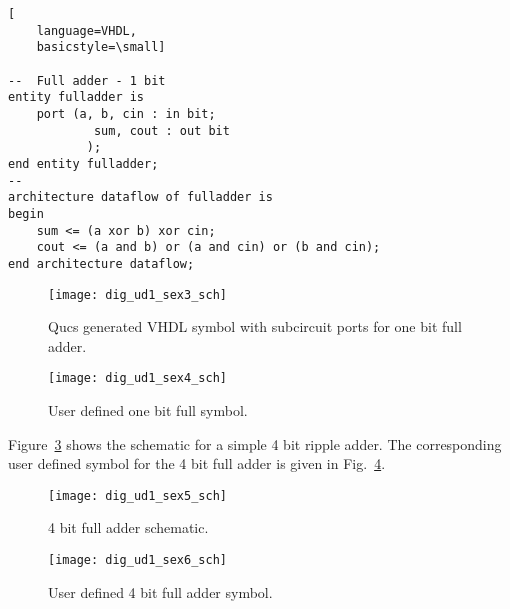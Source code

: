 \begin{itemize}
\begin{table}
\begin{lstlisting}[
    language=VHDL,
    basicstyle=\small]

--  Full adder - 1 bit
entity fulladder is
	port (a, b, cin : in bit;
	        sum, cout : out bit
	       );
end entity fulladder;
--
architecture dataflow of fulladder is
begin
	sum <= (a xor b) xor cin;
	cout <= (a and b) or (a and cin) or (b and cin);
end architecture dataflow;
\end{lstlisting}
\caption{VHDL code for a 1 bit full adder.}
\label{tab:full_adder_1bit}
\end{table}

 \begin{figure}[ht]
  \centering
  \texttt{[image: dig\_ud1\_sex3\_sch]}
  \caption{Qucs generated VHDL symbol with subcircuit ports for one bit full adder.}
  \label{fig:dig_ud1_sex3_sch}
\end{figure} 
\FloatBarrier
\begin{figure}[ht]
  \centering
  \texttt{[image: dig\_ud1\_sex4\_sch]}
  \caption{User defined one bit full symbol.}
  \label{fig:dig_ud1_sex4_sch}
\end{figure} 

Figure~\ref{fig:dig_ud1_sex5_sch} shows the schematic for a simple 4
bit ripple adder.  The corresponding user defined symbol for the 4 bit
full adder is given in Fig.~\ref{fig:dig_ud1_sex6_sch}.

\FloatBarrier
\begin{figure}[ht]
  \centering
  \texttt{[image: dig\_ud1\_sex5\_sch]}
  \caption{4 bit full adder schematic.}
  \label{fig:dig_ud1_sex5_sch}
\end{figure} 
\FloatBarrier
\begin{figure}[ht]
  \centering
  \texttt{[image: dig\_ud1\_sex6\_sch]}
  \caption{User defined 4 bit full adder symbol.}
  \label{fig:dig_ud1_sex6_sch}
\end{figure} 

 \end{itemize}


